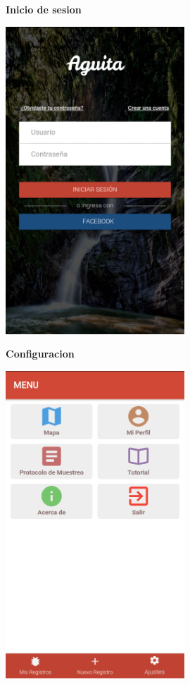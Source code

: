 				\begin{figure}[H]
					\hspace*{1cm}\raggedright\large\textbf{Inicio de sesion}\par\medskip
					\centering
						\includegraphics[width=0.6\textwidth]{Screenshots/login.png}
				\end{figure}

				\begin{figure}[H]
					\hspace*{1cm}\raggedright\large\textbf{Configuracion}\par\medskip
					\centering
						\includegraphics[width=0.6\textwidth]{Screenshots/configuracion.png}
				\end{figure}


